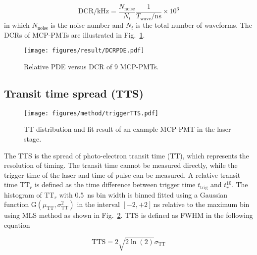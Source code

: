 \begin{equation}
    \mathrm{DCR/kHz} = \frac{N_{\mathrm{noise}}}{N_{t}}\frac{1}{T_{\mathrm{wave}}/\mathrm{ns}}\times 10^{6}
\end{equation}
in which $N_{\mathrm{noise}}$ is the noise number and $N_{t}$ is the total number of waveforms. The DCRs of MCP-PMTs are illustrated in Fig.~\ref{fig:DCRCompare}.

\begin{figure}[!htbp]
    \centering
    \texttt{[image: figures/result/DCRPDE.pdf]}
    \caption{Relative PDE versus DCR of 9 MCP-PMTs.}
    \label{fig:DCRCompare}
\end{figure}

\subsection{Transit time spread (TTS)}
\begin{figure}[!htbp]
    \centering
    \texttt{[image: figures/method/triggerTTS.pdf]}
    \caption{TT distribution and fit result of an example MCP-PMT in the laser stage.}
    \label{fig:triggerTTS}
\end{figure}
The TTS is the spread of photo-electron transit time (TT), which represents the resolution of timing. The transit time cannot be measured directly, while the trigger time of the laser and time of pulse can be measured. A relative transit time $\mathrm{TT}_r$ is defined as the time difference between trigger time $t_{\mathrm{trig}}$ and $t_r^{10}$. The histogram of $\mathrm{TT}_r$ with \SI{0.5}{ns} bin width is binned fitted using a Gaussian function G$(\mu_{\mathrm{TT}},\sigma_{\mathrm{TT}}^2)$ in the interval $[-2,+2]$\,ns relative to the maximum bin using MLS method as shown in Fig.~\ref{fig:triggerTTS}.
TTS is defined as FWHM\cite{HAMAMATSUManual} in the following equation

\begin{equation}
    \mathrm{TTS}=2\sqrt{2\ln(2)}\sigma_{\mathrm{TT}}
\end{equation}
